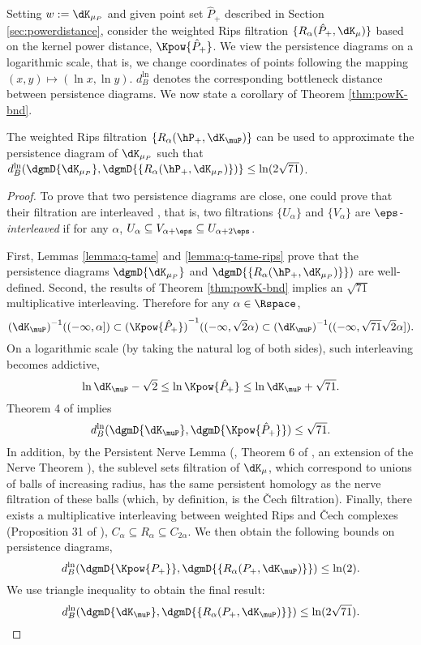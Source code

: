 \documentclass[11pt]{myclass}
\begin{document}
Setting $w: = \dK_{\mu_P}$ and given point set $\hat{P}_+$ described in Section \ref{sec:powerdistance},  consider the weighted Rips filtration $\{R_{\alpha}(\hat{P}_+,\dK_\mu)\}$ based on the kernel power distance, $\Kpow{\hat{P}_+}$. 
We view the persistence diagrams on a logarithmic scale, that is, we change coordinates of points following the mapping $(x, y) \mapsto (\ln x, \ln y)$. $d_B^{\ln}$ denotes the corresponding bottleneck distance between persistence diagrams.  We now state a corollary of Theorem \ref{thm:powK-bnd}.
\begin{corollary}
\label{cor:wRip}
The weighted Rips filtration $\{R_{\alpha}(\hP_+,\dK_\muP)\}$ can be used to  approximate the persistence diagram of $\dK_{\mu_P}$ such that 
$d_B^{\rm \ln}(\dgmD{\dK_{\mu_P}}, \dgmD{\{R_{\alpha}(\hP_+,\dK_{\mu_P})\})} \leq \ln(2\sqrt{71})$.
\end{corollary}
\begin{proof}
To prove that two persistence diagrams are close, one could prove that their filtration are interleaved \cite{ChazalCohen-SteinerGlisse2009}, 
that is, two filtrations $\{U_{\alpha}\}$ and $\{V_{\alpha}\}$ are \emph{$\eps$-interleaved} if for any $\alpha$, $U_{\alpha} \subseteq V_{\alpha+\eps} \subseteq U_{\alpha+2\eps}$.  


First, Lemmas \ref{lemma:q-tame} and \ref{lemma:q-tame-rips} prove that the persistence diagrams $\dgmD{\dK_{\mu_P}}$ and $\dgmD{\{R_{\alpha}(\hP_+,\dK_{\mu_P})\}})$ are well-defined. 
Second, the results of Theorem \ref{thm:powK-bnd} implies an $\sqrt{71}$ multiplicative interleaving. 
Therefore for any $\alpha \in \Rspace$, 
\[
{(\dK_\muP)}^{-1}((-\infty, \alpha]) \subset {(\Kpow{\hat P_+})}^{-1}((-\infty, \sqrt{2}\alpha) \subset {(\dK_{\muP})}^{-1}((-\infty, \sqrt{71}\sqrt{2}\alpha]).
\]
On a logarithmic scale (by taking the natural log of both sides), such interleaving becomes addictive, 
\[
\ln \dK_\muP - \sqrt{2} \leq \ln \Kpow{\hat P_+} \leq \ln \dK_\muP + \sqrt{71}.  
\]
Theorem 4 of \cite{ChazalSilvaGlisse2013} implies 
\[
d_B^{\rm \ln}(\dgmD{\dK_\muP}, \dgmD{\Kpow{\hat P_+}}) \leq \sqrt{71}.
\]
In addition, by the Persistent Nerve Lemma (\cite{ChazalOudot2008}, Theorem 6 of \cite{Sheehy2012}, an extension of the Nerve Theorem \cite{Hatcher2002}), 
the sublevel sets filtration of $\dK_\mu$, which correspond to unions of balls of increasing radius, has the same persistent homology as the nerve filtration of these balls (which, by definition, is the \v{C}ech filtration).
Finally, there exists a multiplicative interleaving between weighted Rips and \v{C}ech complexes (Proposition 31 of \cite{ChazalSilvaGlisse2013}), 
$
C_{\alpha} \subseteq R_{\alpha} \subseteq C_{2\alpha}. 
$
We then obtain the following bounds on persistence diagrams,  
\[
d_B^{\rm \ln}(\dgmD{\Kpow{P_+}}, \dgmD{\{R_{\alpha}(P_+,\dK_\muP)\}}) \leq \ln(2).
\]
We use triangle inequality to obtain the final result: 
\[
d_B^{\rm \ln}(\dgmD{\dK_\muP}, \dgmD{\{R_{\alpha}(P_+,\dK_\muP)\}}) \leq \ln(2\sqrt{71}). \qedhere
\]
\end{proof}
\end{document}
